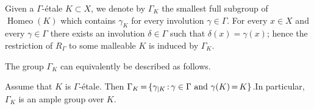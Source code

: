\documentclass[AHL,Unicode]{cedram}
\DeclareMathOperator{\Homeo}{Homeo}
\newcommand*{\Mk}{\mkern -2mu}
\begin{document}
Given a $\Gamma$-étale $K \subset X$, we denote by $\Gamma_K$ the smallest full subgroup of $\Homeo(K)$ which contains $\gamma_K$ for every involution $\gamma \in \Gamma$. For every $x \in X$ and every $\gamma \in \Gamma$ there exists an involution $\delta \in \Gamma$ such that $\delta(x)=\gamma(x)$; hence the restriction of $R_\Gamma$ to some malleable $K$ is induced by $\Gamma_K$.

The group $\Gamma_K$ can equivalently be described as follows.

\begin{lemm}\label{l:induced_group_is_what_you_expect}
%
\!\!
Assume that $K$ is $\Gamma$-étale. Then $\Gamma_K\Mk =\Mk\{\gamma_{|K}\Mk :\Mk \gamma \in \Gamma \text{ and } \gamma(K)\Mk=\Mk K\}$.\linebreak In particular, $\Gamma_K$ is an ample group over $K$.
\end{lemm}
\end{document}
